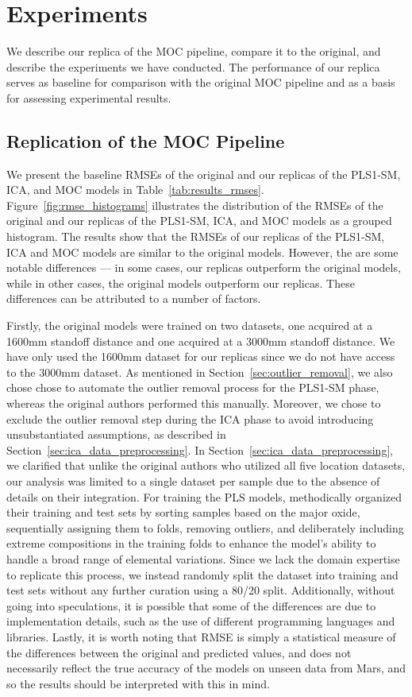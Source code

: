 \section{Experiments}\label{sec:experiments}
We describe our replica of the MOC pipeline, compare it to the original, and describe the experiments we have conducted.
The performance of our replica serves as baseline for comparison with the original MOC pipeline and as a basis for assessing experimental results.

\subsection{Replication of the MOC Pipeline}\label{sec:replica_moc}
We present the baseline RMSEs of the original and our replicas of the PLS1-SM, ICA, and MOC models in Table~\ref{tab:results_rmses}.
Figure~\ref{fig:rmse_histograms} illustrates the distribution of the RMSEs of the original and our replicas of the PLS1-SM, ICA, and MOC models as a grouped histogram.
The results show that the RMSEs of our replicas of the PLS1-SM, ICA and MOC models are similar to the original models.
However, the are some notable differences --- in some cases, our replicas outperform the original models, while in other cases, the original models outperform our replicas.
These differences can be attributed to a number of factors.

Firstly, the original models were trained on two datasets, one acquired at a 1600mm standoff distance and one acquired at a 3000mm standoff distance.
We have only used the 1600mm dataset for our replicas since we do not have access to the 3000mm dataset.
As mentioned in Section~\ref{sec:outlier_removal}, we also chose chose to automate the outlier removal process for the PLS1-SM phase, whereas the original authors performed this manually.
Moreover, we chose to exclude the outlier removal step during the ICA phase to avoid introducing unsubstantiated assumptions, as described in Section~\ref{sec:ica_data_preprocessing}.
In Section~\ref{sec:ica_data_preprocessing}, we clarified that unlike the original authors who utilized all five location datasets, our analysis was limited to a single dataset per sample due to the absence of details on their integration.
For training the PLS models, \citet{andersonImprovedAccuracyQuantitative2017} methodically organized their training and test sets by sorting samples based on the major oxide, sequentially assigning them to folds, removing outliers, and deliberately including extreme compositions in the training folds to enhance the model's ability to handle a broad range of elemental variations.
Since we lack the domain expertise to replicate this process, we instead randomly split the dataset into training and test sets without any further curation using a 80/20 split.
Additionally, without going into speculations, it is possible that some of the differences are due to implementation details, such as the use of different programming languages and libraries.
Lastly, it is worth noting that RMSE is simply a statistical measure of the differences between the original and predicted values, and does not necessarily reflect the true accuracy of the models on unseen data from Mars, and so the results should be interpreted with this in mind.

